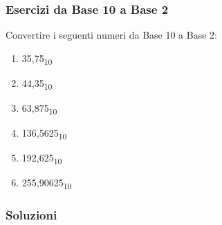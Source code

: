 \documentclass{article}
\begin{document}
\subsubsection{Esercizi da Base 10 a Base 2}
Convertire i seguenti numeri da Base 10 a Base 2:
\begin{enumerate}
\item 35,75\textsubscript{10}
\item 44,35\textsubscript{10}
\item 63,875\textsubscript{10}
\item 136,5625\textsubscript{10}
\item 192,625\textsubscript{10}
\item 255,90625\textsubscript{10}
\end{enumerate}

\subsubsection{Soluzioni}
\end{document}
